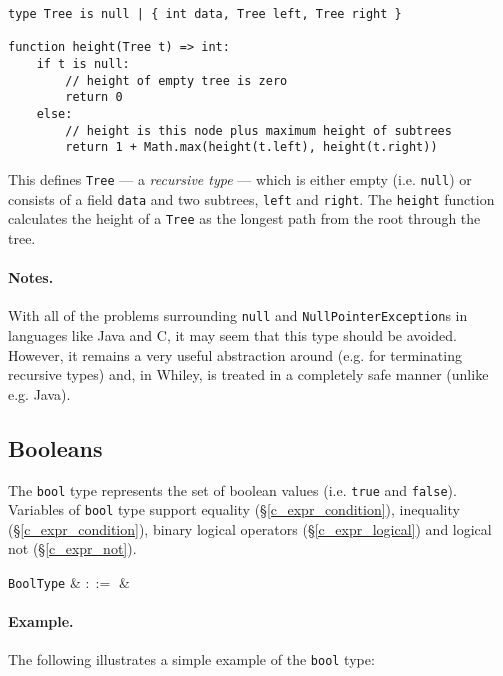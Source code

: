 \begin{lstlisting}
type Tree is null | { int data, Tree left, Tree right }

function height(Tree t) => int:
    if t is null:
        // height of empty tree is zero
        return 0
    else:
        // height is this node plus maximum height of subtrees
        return 1 + Math.max(height(t.left), height(t.right))
\end{lstlisting}
This defines \lstinline{Tree} --- a {\em recursive type} --- which is either empty (i.e. \lstinline{null}) or consists of a field \lstinline{data} and two subtrees, \lstinline{left} and \lstinline{right}.  The \lstinline{height} function calculates the height of a \lstinline{Tree} as the longest path from the root through the tree.

\paragraph{Notes.}  With all of the problems surrounding \lstinline{null} and \lstinline{NullPointerException}s in languages like Java and C, it may seem that this type should be avoided. However, it remains a very useful abstraction around (e.g. for terminating recursive types) and, in Whiley, is treated in a completely safe manner (unlike e.g. Java).


\subsection{Booleans}
\label{c_types_bool}

The \lstinline{bool} type represents the set of boolean values (i.e. \lstinline{true} and \lstinline{false}).  Variables of \lstinline{bool} type support equality (\S\ref{c_expr_condition}), inequality (\S\ref{c_expr_condition}), binary logical operators (\S\ref{c_expr_logical}) and logical not (\S\ref{c_expr_not}).

\begin{syntax}
 \verb+BoolType+ & $::=$ &  \\
\end{syntax}

\paragraph{Example.} The following illustrates a simple example of the \lstinline{bool} type:

